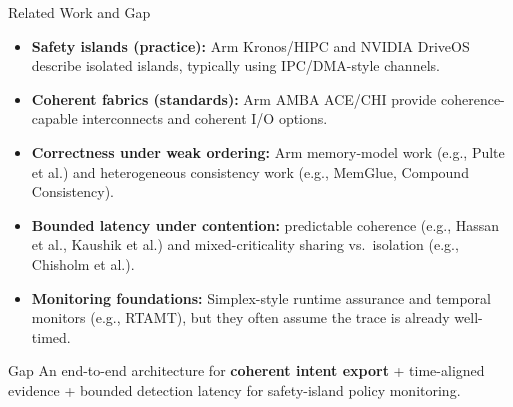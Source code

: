 \documentclass[aspectratio=169,12pt]{beamer}
\newcommand{\hl}[1]{\textcolor{Accent}{\textbf{#1}}}
\newcommand{\keyword}[1]{\textcolor{MidBlue}{\textbf{#1}}}
\begin{document}
\begin{frame}[shrink=5]{Related Work and Gap}
\begin{itemize}
\item \keyword{Safety islands (practice):} Arm Kronos/HIPC and NVIDIA DriveOS describe isolated islands, typically using IPC/DMA-style channels.
\item \keyword{Coherent fabrics (standards):} Arm AMBA ACE/CHI provide coherence-capable interconnects and coherent I/O options.
\item \keyword{Correctness under weak ordering:} Arm memory-model work (e.g., Pulte et al.) and heterogeneous consistency work (e.g., MemGlue, Compound Consistency).
\item \keyword{Bounded latency under contention:} predictable coherence (e.g., Hassan et al., Kaushik et al.) and mixed-criticality sharing vs.\ isolation (e.g., Chisholm et al.).
\item \keyword{Monitoring foundations:} Simplex-style runtime assurance and temporal monitors (e.g., RTAMT), but they often assume the trace is already well-timed.
\end{itemize}

\begin{alertblock}{Gap}
An end-to-end architecture for \hl{coherent intent export} + time-aligned evidence + bounded detection latency for safety-island policy monitoring.
\end{alertblock}
\end{frame}
\end{document}

